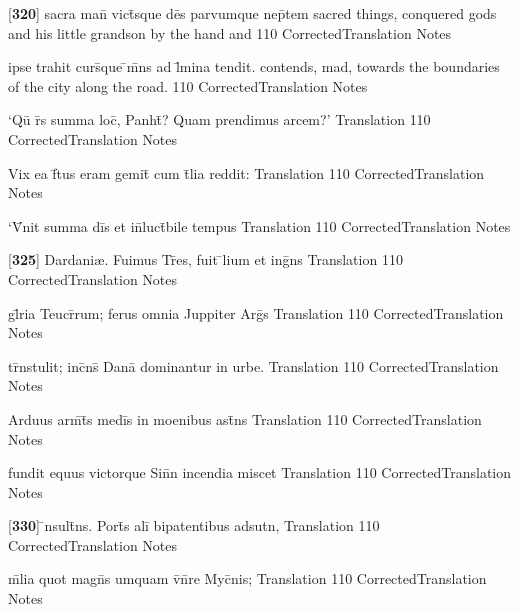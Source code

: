 \latline
  {[\textbf{320}] sacra man\={} vict\={}sque de\={}s parvumque nep\={}tem}
  { sacred things, conquered gods and his little grandson by the hand and  }
  {110}
  { CorrectedTranslation }
  { Notes }


\latline
  {ipse trahit curs\={}que \={}m\={}ns ad l\={\macron {\i}}mina tendit.}
  { contends, mad, towards the boundaries of the city along the road. }
  {110}
  { CorrectedTranslation }
  { Notes }


\latline
  {`Qu\={} r\={}s summa loc\={}, Panht\={}?  Quam prendimus arcem?'}
  { Translation }
  {110}
  { CorrectedTranslation }
  { Notes }


\latline
  {Vix ea f\={}tus eram gemit\={} cum t\={}lia reddit:}
  { Translation }
  {110}
  { CorrectedTranslation }
  { Notes }


\latline
  {`V\={}nit summa di\={}s et in\={}luct\={}bile tempus}
  { Translation }
  {110}
  { CorrectedTranslation }
  { Notes }


\latline
  {[\textbf{325}] Dardani{\ae}.  Fuimus Tr\={}es, fuit \={}lium et ing\={}ns}
  { Translation }
  {110}
  { CorrectedTranslation }
  { Notes }


\latline
  {gl\={}ria Teucr\={}rum; ferus omnia Juppiter Arg\={}s}
  { Translation }
  {110}
  { CorrectedTranslation }
  { Notes }


\latline
  {tr\={}nstulit; inc\={}ns\={} Dana\={\macron {\i}} dominantur in urbe.}
  { Translation }
  {110}
  { CorrectedTranslation }
  { Notes }


\latline
  {Arduus arm\={}t\={}s medi\={\macron {\i}}s in moenibus ast\={}ns}
  { Translation }
  {110}
  { CorrectedTranslation }
  { Notes }


\latline
  {fundit equus victorque Sin\={}n incendia miscet}
  { Translation }
  {110}
  { CorrectedTranslation }
  { Notes }


\latline
  {[\textbf{330}] \={\macron {\i}}nsult\={}ns.  Port\={\macron {\i}}s ali\={\macron {\i}} bipatentibus adsutn,}
  { Translation }
  {110}
  { CorrectedTranslation }
  { Notes }


\latline
  {m\={\macron {\i}}lia quot magn\={\macron {\i}}s umquam v\={}n\={}re Myc\={}nis;}
  { Translation }
  {110}
  { CorrectedTranslation }
  { Notes }


